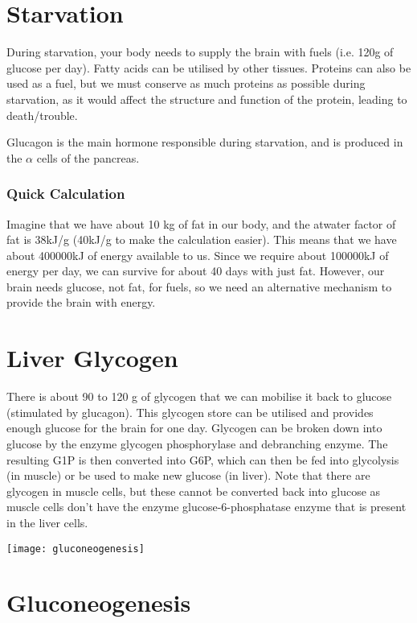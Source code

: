 \section{Starvation}

During starvation, your body needs to supply the brain with fuels (i.e. 120g of glucose per day).
Fatty acids can be utilised by other tissues.
Proteins can also be used as a fuel, but we must conserve as much proteins as possible during starvation, as it would affect the structure and function of the protein, leading to death/trouble.

Glucagon is the main hormone responsible during starvation, and is produced in the $\alpha$ cells of the pancreas.

\subsubsection*{Quick Calculation}

Imagine that we have about 10 kg of fat in our body, and the atwater factor of fat is 38kJ/g (40kJ/g to make the calculation easier).
This means that we have about 400000kJ of energy available to us.
Since we require about 100000kJ of energy per day, we can survive for about 40 days with just fat.
However, our brain needs glucose, not fat, for fuels, so we need an alternative mechanism to provide the brain with energy.

\section{Liver Glycogen}

There is about 90 to 120 g of glycogen that we can mobilise it back to glucose (stimulated by glucagon).
This glycogen store can be utilised and provides enough glucose for the brain for one day.
Glycogen can be broken down into glucose by the enzyme glycogen phosphorylase and debranching enzyme.
The resulting G1P is then converted into G6P, which can then be fed into glycolysis (in muscle) or be used to make new glucose (in liver).
Note that there are glycogen in muscle cells, but these cannot be converted back into glucose as muscle cells don't have the enzyme glucose-6-phosphatase enzyme that is present in the liver cells.

\begin{center}
\texttt{[image: gluconeogenesis]}
\end{center}

\section{Gluconeogenesis}

